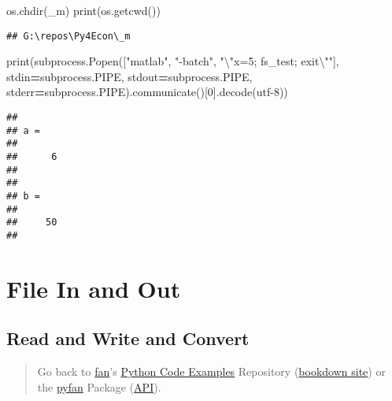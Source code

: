 \documentclass[
]{book}
\newenvironment{Shaded}{\begin{snugshade}}{\end{snugshade}}
\newcommand{\BuiltInTok}[1]{#1}
\newcommand{\CharTok}[1]{\textcolor[rgb]{0.31,0.60,0.02}{#1}}
\newcommand{\DecValTok}[1]{\textcolor[rgb]{0.00,0.00,0.81}{#1}}
\newcommand{\NormalTok}[1]{#1}
\newcommand{\OperatorTok}[1]{\textcolor[rgb]{0.81,0.36,0.00}{\textbf{#1}}}
\newcommand{\StringTok}[1]{\textcolor[rgb]{0.31,0.60,0.02}{#1}}
\begin{document}
\begin{Shaded}
\begin{Highlighting}[]
\NormalTok{os.chdir(}\StringTok{\textquotesingle{}\_m\textquotesingle{}}\NormalTok{)}
\BuiltInTok{print}\NormalTok{(os.getcwd())}
\end{Highlighting}
\end{Shaded}

\begin{verbatim}
## G:\repos\Py4Econ\_m
\end{verbatim}

\begin{Shaded}
\begin{Highlighting}[]
\BuiltInTok{print}\NormalTok{(subprocess.Popen([}\StringTok{"matlab"}\NormalTok{, }\StringTok{"{-}batch"}\NormalTok{, }\StringTok{"}\CharTok{\textbackslash{}"}\StringTok{x=5; fs\_test; exit}\CharTok{\textbackslash{}"}\StringTok{"}\NormalTok{],}
\NormalTok{                       stdin}\OperatorTok{=}\NormalTok{subprocess.PIPE,}
\NormalTok{                       stdout}\OperatorTok{=}\NormalTok{subprocess.PIPE,}
\NormalTok{                       stderr}\OperatorTok{=}\NormalTok{subprocess.PIPE).communicate()[}\DecValTok{0}\NormalTok{].decode(}\StringTok{\textquotesingle{}utf{-}8\textquotesingle{}}\NormalTok{))}
\end{Highlighting}
\end{Shaded}

\begin{verbatim}
## 
## a =
## 
##      6
## 
## 
## b =
## 
##     50
## 
\end{verbatim}

\hypertarget{file-in-and-out}{%
\section{File In and Out}\label{file-in-and-out}}

\hypertarget{read-and-write-and-convert}{%
\subsection{Read and Write and Convert}\label{read-and-write-and-convert}}

\begin{quote}
Go back to \href{http://fanwangecon.github.io/}{fan}'s \href{https://fanwangecon.github.io/Py4Econ/}{Python Code Examples} Repository (\href{https://fanwangecon.github.io/Py4Econ/bookdown}{bookdown site}) or the \href{https://pyfan.readthedocs.io/en/latest/}{pyfan} Package (\href{https://pyfan.readthedocs.io/en/latest/reference.html}{API}).
\end{quote}
\end{document}
